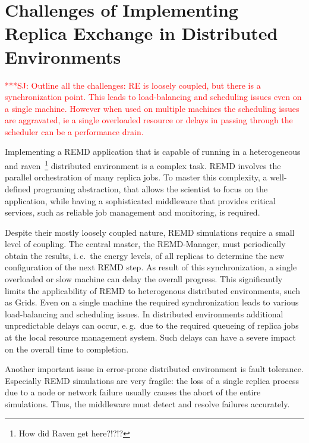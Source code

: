 \documentclass{rspublic}
\newcommand{\jhanote}[1]{ {\textcolor{red} { ***SJ: #1 }}}
\newcommand{\jhanote}[1]{}
\begin{document}

\section{Challenges of Implementing Replica Exchange in Distributed
  Environments}
\label{sec:challenges}
\jhanote{Outline all the challenges: RE is loosely coupled, but there
  is a synchronization point. This leads to load-balancing and
  scheduling issues even on a single machine. However when used on
  multiple machines the scheduling issues are aggravated, ie a single
  overloaded resource or delays in passing through the scheduler can
  be a performance drain.}                
                                               

Implementing a REMD application that is capable of running in a
heterogeneous and raven~\footnote{How did Raven get here?!?!?}
distributed environment is a complex task. REMD involves the parallel
orchestration of many replica jobs. To master this complexity, a
well-defined programing abstraction, that allows the scientist to
focus on the application, while having a sophisticated middleware that
provides critical services, such as reliable job management and
monitoring, is required.

Despite their mostly loosely coupled nature, REMD simulations require
a small level of coupling.  The central master, the REMD-Manager, must
periodically obtain the results, i.\,e.\ the energy levels, of all
replicas to determine the new configuration of the next REMD step.  As
result of this synchronization, a single overloaded or slow machine
can delay the overall progress. This significantly limits the
applicability of REMD to heterogenous distributed environments, such
as Grids.  Even on a single machine the required synchronization leads
to various load-balancing and scheduling issues. In distributed
environments additional unpredictable delays can occur, e.\,g.\ due to
the required queueing of replica jobs at the local resource management
system. Such delays can have a severe impact on the overall time to
completion.
                 
Another important issue in error-prone distributed environment is
fault tolerance.  Especially REMD simulations are very fragile: the
loss of a single replica process due to a node or network failure
usually causes the abort of the entire simulations. Thus, the
middleware must detect and resolve failures accurately.
                                  
\end{document}
